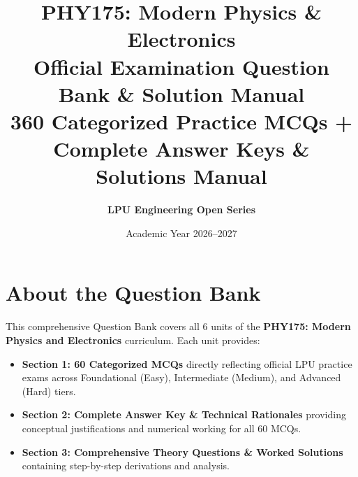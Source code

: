 \documentclass[11pt,a4paper,twoside,openright]{report}
\title{\Huge\bfseries\color{LPUNavy} PHY175: Modern Physics \& Electronics\\[0.5em]
\Large\color{LPUOrange} Official Examination Question Bank \& Solution Manual\\[1em]
\normalsize\color{DarkSlate} 360 Categorized Practice MCQs + Complete Answer Keys \& Solutions Manual}
\author{\textbf{LPU Engineering Open Series}}
\date{Academic Year 2026--2027}
\begin{document}
\maketitle

\chapter*{About the Question Bank}
This comprehensive Question Bank covers all 6 units of the \textbf{PHY175: Modern Physics and Electronics} curriculum. Each unit provides:
\begin{itemize}
    \item \textbf{Section 1: 60 Categorized MCQs} directly reflecting official LPU practice exams across Foundational (Easy), Intermediate (Medium), and Advanced (Hard) tiers.
    \item \textbf{Section 2: Complete Answer Key \& Technical Rationales} providing conceptual justifications and numerical working for all 60 MCQs.
    \item \textbf{Section 3: Comprehensive Theory Questions \& Worked Solutions} containing step-by-step derivations and analysis.
\end{itemize}

\tableofcontents







\end{document}
